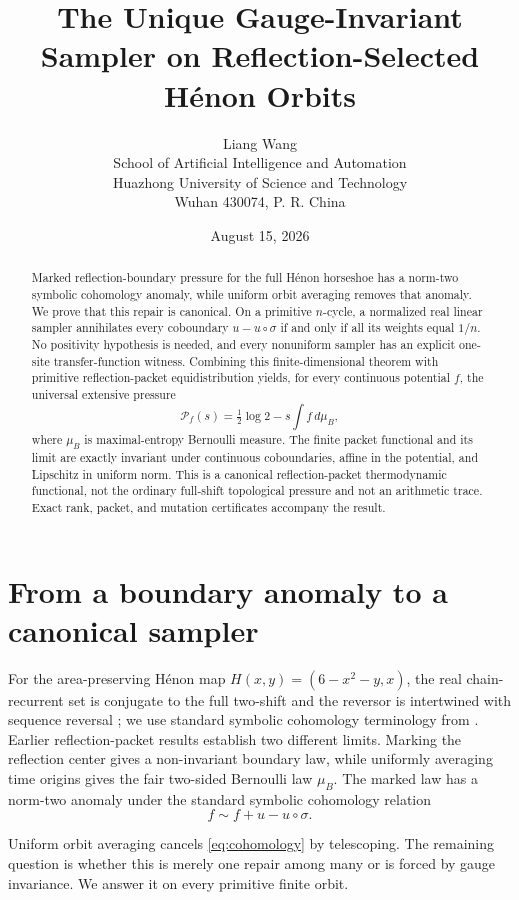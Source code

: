 \documentclass[11pt]{article}
\title{The Unique Gauge-Invariant Sampler on Reflection-Selected H\'enon Orbits}
\author{Liang Wang\\\small School of Artificial Intelligence and Automation\\\small Huazhong University of Science and Technology\\\small Wuhan 430074, P. R. China}
\date{August 15, 2026}
\begin{document}
\maketitle

\begin{abstract}
Marked reflection-boundary pressure for the full H\'enon horseshoe has a
norm-two symbolic cohomology anomaly, while uniform orbit averaging removes
that anomaly.  We prove that this repair is canonical.  On a primitive
$n$-cycle, a normalized real linear sampler annihilates every coboundary
$u-u\circ\sigma$ if and only if all its weights equal $1/n$.  No positivity
hypothesis is needed, and every nonuniform sampler has an explicit one-site
transfer-function witness.  Combining this finite-dimensional theorem with
primitive reflection-packet equidistribution yields, for every continuous
potential $f$, the universal extensive pressure
\[
 \mathcal P_f(s)=\tfrac12\log2-s\int f\,d\mu_B,
\]
where $\mu_B$ is maximal-entropy Bernoulli measure.  The finite packet
functional and its limit are exactly invariant under continuous
coboundaries, affine in the potential, and Lipschitz in uniform norm.  This
is a canonical reflection-packet thermodynamic functional, not the ordinary
full-shift topological pressure and not an arithmetic trace.  Exact rank,
packet, and mutation certificates accompany the result.
\end{abstract}

\section{From a boundary anomaly to a canonical sampler}

For the area-preserving H\'enon map $H(x,y)=(6-x^2-y,x)$, the real
chain-recurrent set is conjugate to the full two-shift and the reversor is
intertwined with sequence reversal
\cite{DevaneyNitecki1979,Arai2007}; we use standard symbolic cohomology
terminology from \citet{LindMarcus1995}.  Earlier reflection-packet results
establish two different limits.  Marking the reflection center gives a
non-invariant boundary law, while uniformly averaging time origins gives the
fair two-sided Bernoulli law $\mu_B$.  The marked law has a norm-two anomaly
under the standard symbolic cohomology relation
\begin{equation}\label{eq:cohomology}
 f\sim f+u-u\circ\sigma.
\end{equation}

Uniform orbit averaging cancels \eqref{eq:cohomology} by telescoping.  The
remaining question is whether this is merely one repair among many or is
forced by gauge invariance.  We answer it on every primitive finite orbit.
\end{document}
